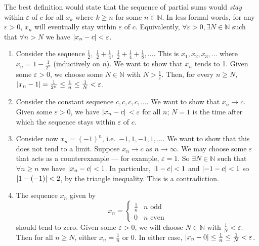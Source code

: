 The best definition would state that the sequence of partial sums would \textit{stay} within \(\varepsilon\) of \(c\) for all \(x_k\) where \(k \geq n\) for some \(n \in \mathbb N\).
In less formal words, for any \(\varepsilon > 0\), \(x_n\) will eventually stay within \(\varepsilon\) of \(c\).
Equivalently, \(\forall \varepsilon > 0, \exists N \in \mathbb N\) such that \(\forall n > N\) we have \(\abs{x_n - c} < \varepsilon\).
\begin{enumerate}
	\item Consider the sequence \(\frac{1}{2},\; \frac{1}{2} + \frac{1}{4},\; \frac{1}{2} + \frac{1}{4} + \frac{1}{8}, \dots\).
	      This is \(x_1, x_2, x_3, \dots\) where \(x_n = 1 - \frac{1}{2^n}\) (inductively on \(n\)).
	      We want to show that \(x_n\) tends to 1.
	      Given some \(\varepsilon > 0\), we choose some \(N \in \mathbb N\) with \(N > \frac{1}{\varepsilon}\).
	      Then, for every \(n \geq N\), \(\abs{x_n - 1} = \frac{1}{2^n} \leq \frac{1}{n} \leq \frac{1}{N} < \varepsilon\).
	\item Consider the constant sequence \(c, c, c, c, \dots\).
	      We want to show that \(x_n \to c\).
	      Given some \(\varepsilon > 0\), we have \(\abs*{x_n - c} < \varepsilon\) for all \(n\); \(N=1\) is the time after which the sequence stays within \(\varepsilon\) of \(c\).
	\item Consider now \(x_n = (-1)^n\), i.e.\ \(-1, 1, -1, 1, \dots\).
	      We want to show that this does not tend to a limit.
	      Suppose \(x_n \to c\) as \(n \to \infty\).
	      We may choose some \(\varepsilon\) that acts as a counterexample --- for example, \(\varepsilon = 1\).
	      So \(\exists N \in \mathbb N\) such that \(\forall n \geq n\) we have \(\abs{x_n - c} < 1\).
	      In particular, \(\abs{1 - c} < 1\) and \(\abs{-1 - c} < 1\) so \(\abs{1 - (-1)} < 2\), by the triangle inequality.
	      This is a contradiction.
	\item The sequence \(x_n\) given by
	      \[
		      x_n = \begin{cases}
			      \frac{1}{n} & n \text{ odd}  \\
			      0           & n \text{ even}
		      \end{cases}
	      \]
	      should tend to zero.
	      Given some \(\varepsilon > 0\), we will choose \(N \in \mathbb N\) with \(\frac{1}{N} < \varepsilon\).
	      Then for all \(n \geq N\), either \(x_n = \frac{1}{n}\) or 0.
	      In either case, \(\abs{x_n - 0} \leq \frac{1}{n} \leq \frac{1}{N} < \varepsilon\).
\end{enumerate}
